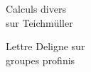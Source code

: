 
\begin{flushright}
Calculs divers\\
sur Teichmüller

\medskip
Lettre Deligne sur\\
groupes profinis
\end{flushright}


